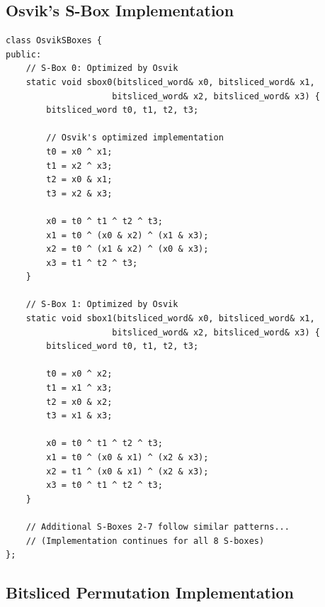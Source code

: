 \documentclass[12pt,a4paper]{article}
\begin{document}
\subsection{Osvik's S-Box Implementation}

\begin{lstlisting}[caption=Osvik's Optimized S-Boxes]
class OsvikSBoxes {
public:
    // S-Box 0: Optimized by Osvik
    static void sbox0(bitsliced_word& x0, bitsliced_word& x1, 
                     bitsliced_word& x2, bitsliced_word& x3) {
        bitsliced_word t0, t1, t2, t3;
        
        // Osvik's optimized implementation
        t0 = x0 ^ x1;
        t1 = x2 ^ x3;
        t2 = x0 & x1;
        t3 = x2 & x3;
        
        x0 = t0 ^ t1 ^ t2 ^ t3;
        x1 = t0 ^ (x0 & x2) ^ (x1 & x3);
        x2 = t0 ^ (x1 & x2) ^ (x0 & x3);
        x3 = t1 ^ t2 ^ t3;
    }

    // S-Box 1: Optimized by Osvik
    static void sbox1(bitsliced_word& x0, bitsliced_word& x1, 
                     bitsliced_word& x2, bitsliced_word& x3) {
        bitsliced_word t0, t1, t2, t3;
        
        t0 = x0 ^ x2;
        t1 = x1 ^ x3;
        t2 = x0 & x2;
        t3 = x1 & x3;
        
        x0 = t0 ^ t1 ^ t2 ^ t3;
        x1 = t0 ^ (x0 & x1) ^ (x2 & x3);
        x2 = t1 ^ (x0 & x1) ^ (x2 & x3);
        x3 = t0 ^ t1 ^ t2 ^ t3;
    }

    // Additional S-Boxes 2-7 follow similar patterns...
    // (Implementation continues for all 8 S-boxes)
};
\end{lstlisting}

\subsection{Bitsliced Permutation Implementation}
\end{document}
